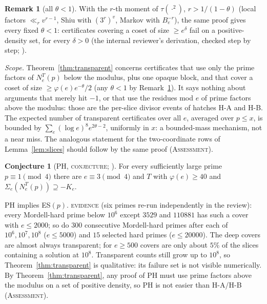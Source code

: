 \documentclass[10pt,reqno]{amsart}
\theoremstyle{definition}
\newtheorem{remark}[theorem]{Remark}
\newtheorem{conjecture}[theorem]{Conjecture}
\numberwithin{equation}{section}
\newcommand{\status}[1]{\textup{\textsc{#1}}}
\begin{document}
\begin{remark}[all $\theta<1$]\label{rem:thetaone}
With the $r$-th moment of $\tau(\cdot^2)$, $r>1/(1-\theta)$ (local factors
$\ll_rv^{r-1}$, Shiu with $(3^r)^v$, Markov with $B_e^{-r}$), the same proof
gives every fixed $\theta<1$: certificates covering a coset of size
$\ge e^\delta$ fail on a positive-density set, for every $\delta>0$ (the
internal reviewer's derivation, checked step by step; \cite[\S2.2]{LP}).
\end{remark}

\emph{Scope.} Theorem~\ref{thm:transparent} concerns certificates that use
only the prime factors of $N_e^T(p)$ below the modulus, plus one opaque
block, and that cover a coset of size $\ge\varphi(e)e^{-\theta}/2$ (any
$\theta<1$ by Remark~\ref{rem:thetaone}). It says nothing about
arguments that merely hit $-1$, or that use the residues mod $e$ of prime
factors above the modulus: those are the per-slice divisor events of
hatches H-A and H-B. The expected number of transparent certificates over
all $e$, averaged over $p\le x$, is bounded by $\sum_e(\log e)^8e^{2\theta-2}$, uniformly in $x$: a
bounded-mass mechanism, not a near miss. The analogous statement for the
two-coordinate rows of Lemma~\ref{lem:slices} should follow by the same
proof (\status{Assessment}).

\begin{conjecture}[PH, \status{conjecture}; {\cite[Conj.~5.1]{LP}}]\label{conj:PH}
For every sufficiently large prime $p\equiv1\pmod4$ there are
$e\equiv3\pmod4$ and $T$ with $\varphi(e)\ge40$ and
$\Sigma_e(N_e^T(p))\supseteq-K_e$.
\end{conjecture}
PH implies ES$(p)$. \status{evidence} \cite[\S3]{LP} (six primes
re-run independently in the review): every Mordell-hard prime below $10^6$
except $3529$ and $110881$ has such a cover with $e\le2000$; so do $300$
consecutive Mordell-hard primes after each of $10^6,10^7,10^8$ ($e\le5000$)
and $15$ selected hard primes ($e\le20000$). The deep covers are almost
always transparent; for $e\ge500$ covers are only about $5\%$ of the
slices containing a solution at $10^8$. Transparent counts still grow up to
$10^8$, so Theorem~\ref{thm:transparent} is qualitative: its failure set is
not visible numerically. By Theorem~\ref{thm:transparent},
any proof of PH must use prime factors above the modulus on a set of
positive density, so PH is not easier than H-A/H-B
(\status{Assessment}).
\end{document}
